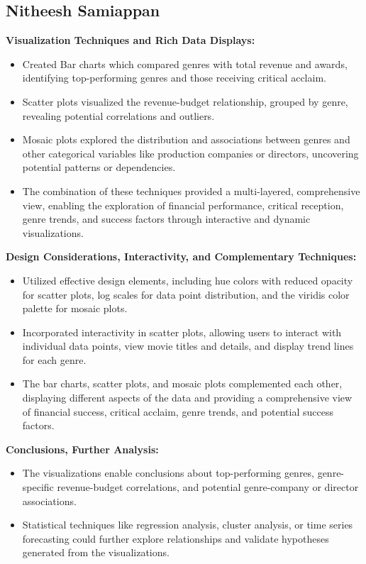 \documentclass[12pt]{article}
\begin{document}
\subsection{Nitheesh Samiappan}
\textbf{Visualization Techniques and Rich Data Displays:}
\begin{itemize}
    \item Created Bar charts which compared genres with total revenue and awards, identifying top-performing genres and those receiving critical acclaim.
    \item Scatter plots visualized the revenue-budget relationship, grouped by genre, revealing potential correlations and outliers.
    \item Mosaic plots explored the distribution and associations between genres and other categorical variables like production companies or directors, uncovering potential patterns or dependencies.
    \item The combination of these techniques provided a multi-layered, comprehensive view, enabling the exploration of financial performance, critical reception, genre trends, and success factors through interactive and dynamic visualizations.
    \end{itemize}
\textbf{Design Considerations, Interactivity, and Complementary Techniques:}
\begin{itemize}
    \item Utilized effective design elements, including hue colors with reduced opacity for scatter plots, log scales for data point distribution, and the viridis color palette for mosaic plots.
    \item Incorporated interactivity in scatter plots, allowing users to interact with individual data points, view movie titles and details, and display trend lines for each genre.
    \item The bar charts, scatter plots, and mosaic plots complemented each other, displaying different aspects of the data and providing a comprehensive view of financial success, critical acclaim, genre trends, and potential success factors.
    \end{itemize}
\textbf{Conclusions, Further Analysis:}
\begin{itemize}
    \item The visualizations enable conclusions about top-performing genres, genre-specific revenue-budget correlations, and potential genre-company or director associations.
    \item Statistical techniques like regression analysis, cluster analysis, or time series forecasting could further explore relationships and validate hypotheses generated from the visualizations.
  \end{itemize}
\end{document}
